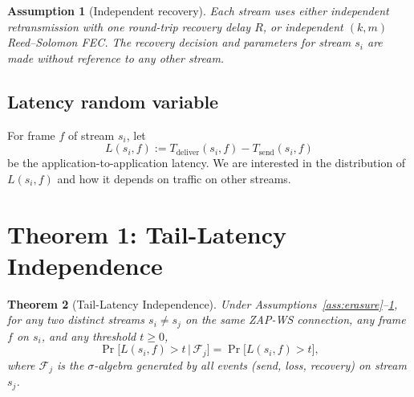 \documentclass[11pt,a4paper]{article}
\newtheorem{theorem}{Theorem}
\newtheorem{assumption}[theorem]{Assumption}
\begin{document}
\begin{assumption}[Independent recovery]\label{ass:recovery}
Each stream uses either independent retransmission with one round-trip
recovery delay $R$, or independent $(k, m)$ Reed--Solomon FEC. The
recovery decision and parameters for stream $s_i$ are made without
reference to any other stream.
\end{assumption}

\subsection{Latency random variable}

For frame $f$ of stream $s_i$, let
\[
L(s_i, f) := T_{\text{deliver}}(s_i, f) - T_{\text{send}}(s_i, f)
\]
be the application-to-application latency. We are interested in the
distribution of $L(s_i, f)$ and how it depends on traffic on other
streams.

\section{Theorem 1: Tail-Latency Independence}

\begin{theorem}[Tail-Latency Independence]\label{thm:independence}
Under Assumptions~\ref{ass:erasure}--\ref{ass:recovery}, for any two
distinct streams $s_i \ne s_j$ on the same ZAP-WS connection, any frame
$f$ on $s_i$, and any threshold $t \ge 0$,
\[
\Pr\!\bigl[L(s_i, f) > t \,\big|\, \mathcal{F}_j\bigr]
= \Pr\!\bigl[L(s_i, f) > t\bigr],
\]
where $\mathcal{F}_j$ is the $\sigma$-algebra generated by all events
(send, loss, recovery) on stream $s_j$.
\end{theorem}
\end{document}
